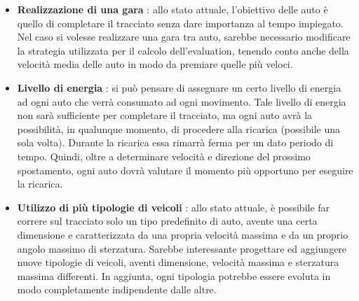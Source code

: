 \documentclass[a4paper,12pt]{article}
\begin{document}
\begin{itemize}
	\item \textbf{Realizzazione di una gara} : allo stato attuale, l'obiettivo delle auto è quello di completare il tracciato senza dare importanza al tempo impiegato. Nel caso si volesse realizzare una gara tra auto, sarebbe necessario modificare la strategia utilizzata per il calcolo dell'evaluation, tenendo conto anche della velocità media delle auto in modo da premiare quelle più veloci.
	\item \textbf{Livello di energia} : si può pensare di assegnare un certo livello di energia ad ogni auto che verrà consumato ad ogni movimento. Tale livello di energia non sarà sufficiente per completare il tracciato, ma ogni auto avrà la possibilità, in qualunque momento, di procedere alla ricarica (possibile una sola volta). Durante la ricarica essa rimarrà ferma per un dato periodo di tempo. Quindi, oltre a determinare velocità e direzione del prossimo spostamento, ogni auto dovrà valutare il momento più opportuno per eseguire la ricarica.
	\item \textbf{Utilizzo di più tipologie di veicoli} : allo stato attuale, è possibile far correre sul tracciato solo un tipo predefinito di auto, avente una certa dimensione e caratterizzata da una propria velocità massima e da un proprio angolo massimo di sterzatura. Sarebbe interessante progettare ed aggiungere nuove tipologie di veicoli, aventi dimensione, velocità massima e sterzatura massima differenti. In aggiunta, ogni tipologia potrebbe essere evoluta in modo completamente indipendente dalle altre. 
\end{itemize}
\end{document}
